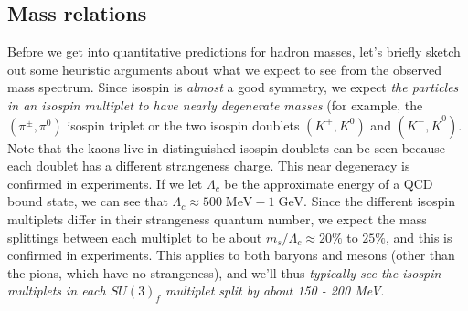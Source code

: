 \documentclass[11pt, oneside]{article}   	%
\theoremstyle{definition}
\numberwithin{equation}{subsection}		%
\begin{document}
\subsection{Mass relations}

Before we get into quantitative predictions for hadron masses, let's briefly sketch out some heuristic arguments about what we expect to see from the observed mass spectrum. 
Since isospin is \textit{almost} a good symmetry, we expect \textit{the particles in an isospin multiplet to have nearly degenerate masses} (for example, 
the $(\pi^\pm, \pi^0)$ isospin triplet or the two isospin doublets $(K^+, K^0)$ and $(K^-, \overline K^0)$. Note that the kaons live in distinguished isospin 
doublets can be seen because each doublet has a different strangeness charge. This near degeneracy is confirmed in experiments. If we let $\Lambda_c$ 
be the approximate energy of a QCD bound state, we can see that $\Lambda_c\approx 500\;\mathrm{MeV} - 1\;\mathrm{GeV}$. Since the different isospin 
multiplets differ in their strangeness quantum number, we expect the mass splittings between each multiplet to be about $m_s / \Lambda_c\approx 
20\%$ to $25\%$, and this is confirmed in experiments. This applies to both baryons and mesons (other than the pions, which have no strangeness), and we'll 
thus \textit{typically see the isospin multiplets in each $SU(3)_f$ multiplet split by about 150 - 200 MeV}. 
\end{document}
